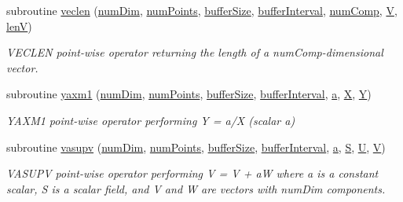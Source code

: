 \begin{DoxyCompactItemize}
subroutine \hyperlink{namespacesimple_ae38e091c7b77f88fbac6a96c4cd798e1}{veclen} (\hyperlink{SATKernels_8H_a680185db8546de161968dabace9e94f1}{num\+Dim}, \hyperlink{ViscidKernels_8H_adf0bf75d0875d1bb42a5348bee7b7bfd}{num\+Points}, \hyperlink{SpecialKernels_8H_aa9426cdf16e85054db35e88f9b68c6be}{buffer\+Size}, \hyperlink{WENOKernels_8H_ad1001168d5432b52e6d0636f4dc0e60c}{buffer\+Interval}, \hyperlink{SpecialKernels_8H_a0ca5e89863a7ef42a6955add3ff97cae}{num\+Comp}, \hyperlink{SpecialKernels_8H_ac6b3e75b07df9bb98a9911c89819ba5a}{V}, \hyperlink{SpecialKernels_8H_ae57c6618bb10bce0dd369e9611a363e2}{lenV})
\begin{DoxyCompactList}\small\item\em V\+E\+C\+L\+EN point-\/wise operator returning the length of a num\+Comp-\/dimensional vector. \end{DoxyCompactList}\item 
subroutine \hyperlink{namespacesimple_a11e2072409fc7bf72ea7abf6b32a6859}{yaxm1} (\hyperlink{SATKernels_8H_a680185db8546de161968dabace9e94f1}{num\+Dim}, \hyperlink{ViscidKernels_8H_adf0bf75d0875d1bb42a5348bee7b7bfd}{num\+Points}, \hyperlink{SpecialKernels_8H_aa9426cdf16e85054db35e88f9b68c6be}{buffer\+Size}, \hyperlink{WENOKernels_8H_ad1001168d5432b52e6d0636f4dc0e60c}{buffer\+Interval}, \hyperlink{SimpleKernels_8H_a80f0b648bfd720a2277538fbad1d1eca}{a}, \hyperlink{SimpleKernels_8H_a1d2fc0c1bfd9fbd97521ac2a8082cd60}{X}, \hyperlink{SimpleKernels_8H_a4731ec58a5102a3b2d3116eaff33f108}{Y})
\begin{DoxyCompactList}\small\item\em Y\+A\+X\+M1 point-\/wise operator performing Y = a/X (scalar a) \end{DoxyCompactList}\item 
subroutine \hyperlink{namespacesimple_ac3b0bcd4d9660231edd99b833499f6c0}{vasupv} (\hyperlink{SATKernels_8H_a680185db8546de161968dabace9e94f1}{num\+Dim}, \hyperlink{ViscidKernels_8H_adf0bf75d0875d1bb42a5348bee7b7bfd}{num\+Points}, \hyperlink{SpecialKernels_8H_aa9426cdf16e85054db35e88f9b68c6be}{buffer\+Size}, \hyperlink{WENOKernels_8H_ad1001168d5432b52e6d0636f4dc0e60c}{buffer\+Interval}, \hyperlink{SimpleKernels_8H_a80f0b648bfd720a2277538fbad1d1eca}{a}, \hyperlink{SimpleKernels_8H_a1851b05129a14a393984de733889e64b}{S}, \hyperlink{SimpleKernels_8H_aca4ab6143606c908fb1a7de286ddddae}{U}, \hyperlink{SpecialKernels_8H_ac6b3e75b07df9bb98a9911c89819ba5a}{V})
\begin{DoxyCompactList}\small\item\em V\+A\+S\+U\+PV point-\/wise operator performing V = V + aW where a is a constant scalar, S is a scalar field, and V and W are vectors with num\+Dim components. \end{DoxyCompactList}\item 

\end{DoxyCompactItemize}

